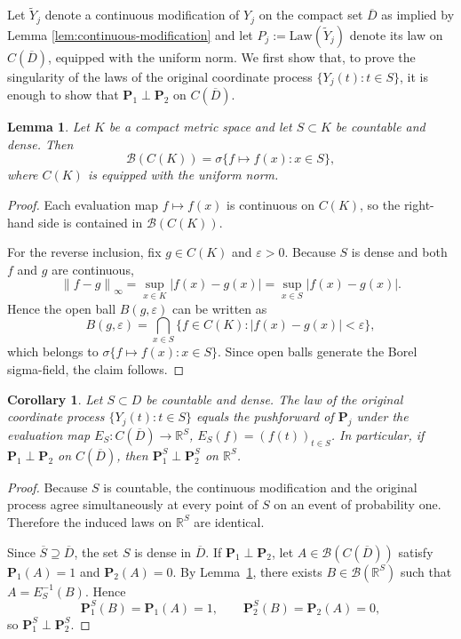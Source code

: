 \documentclass[11pt, reqno]{amsart}
\newtheorem{lemma}{Lemma}
\newtheorem{corollary}{Corollary}
\theoremstyle{remark}
\newcommand{\R}{\mathbb{R}}
\newcommand{\1}{\mathbf{1}}
\newcommand{\abs}[1]{\left\lvert #1 \right\rvert}
\newcommand{\norm}[1]{\left\lVert #1 \right\rVert}
\begin{document}
Let \(\widetilde Y_j\) denote a continuous modification of \(Y_j\) on the
compact set \(\overline D\) as implied by Lemma \ref{lem:continuous-modification} and
let  $P_j := \mathrm{Law}(\widetilde Y_j)$
denote its law on \(C(\overline D)\), equipped with the uniform norm.
We first show that, to prove the singularity of the laws of the original coordinate process $\{Y_j(t):t\in S\}$, it is enough to show that $\mathbf P_1\perp \mathbf P_2$ on $C(\overline D)$.

\begin{lemma}\label{lem:borel-generated}
Let $K$ be a compact metric space and let $S\subset K$ be countable and dense. Then
\[
\mathcal B(C(K))=\sigma\{f\mapsto f(x):x\in S\},
\]
where $C(K)$ is equipped with the uniform norm.
\end{lemma}

\begin{proof}
Each evaluation map $f\mapsto f(x)$ is continuous on $C(K)$, so the right-hand side is contained in $\mathcal B(C(K))$.

For the reverse inclusion, fix $g\in C(K)$ and $\varepsilon>0$. Because $S$ is dense and both $f$ and $g$ are continuous,
\[
\norm{f-g}_\infty = \sup_{x\in K}\abs{f(x)-g(x)} = \sup_{x\in S}\abs{f(x)-g(x)}.
\]
Hence the open ball $B(g,\varepsilon)$ can be written as
\[
B(g,\varepsilon)=\bigcap_{x\in S}\{f\in C(K): \abs{f(x)-g(x)}<\varepsilon\},
\]
which belongs to $\sigma\{f\mapsto f(x):x\in S\}$. Since open balls generate the Borel sigma-field, the claim follows.
\end{proof}

\begin{corollary}\label{cor:dense-observations-from-paths}
Let $S\subset D$ be countable and dense. The law of the original coordinate process $\{Y_j(t):t\in S\}$ equals the pushforward of $\mathbf P_j$ under the evaluation map $E_S:C(\overline D)\to\R^S$, $E_S(f)=(f(t))_{t\in S}$. In particular, if $\mathbf P_1\perp \mathbf P_2$ on $C(\overline D)$, then $\mathbf P_1^S\perp \mathbf P_2^S$ on $\R^S$.
\end{corollary}

\begin{proof}
Because $S$ is countable, the continuous modification and the original process agree simultaneously at every point of $S$ on an event of probability one. Therefore the induced laws on $\R^S$ are identical.

Since $\overline{S} \supseteq \overline{D}$, the set $S$ is dense in $\overline{D}$. If $\mathbf P_1\perp \mathbf P_2$, let $A\in\mathcal B(C(\overline D))$ satisfy $\mathbf P_1(A)=1$ and $\mathbf P_2(A)=0$. By Lemma~\ref{lem:borel-generated}, there exists $B\in\mathcal B(\R^S)$ such that $A=E_S^{-1}(B)$. Hence
\[
\mathbf P_1^S(B)=\mathbf P_1(A)=1,
\qquad
\mathbf P_2^S(B)=\mathbf P_2(A)=0,
\]
so $\mathbf P_1^S\perp \mathbf P_2^S$.
\end{proof}
\end{document}
